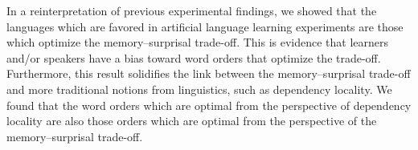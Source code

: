 In a reinterpretation of previous experimental findings, we showed that the languages which are favored in artificial language learning experiments are those which optimize the memory--surprisal trade-off. 
This is evidence that learners and/or speakers have a bias toward word orders that optimize the trade-off. 
Furthermore, this result solidifies the link between the memory--surprisal trade-off and more traditional notions from linguistics, such as dependency locality. 
We found that the word orders which are optimal from the perspective of dependency locality are also those orders which are optimal from the perspective of the memory--surprisal trade-off.
